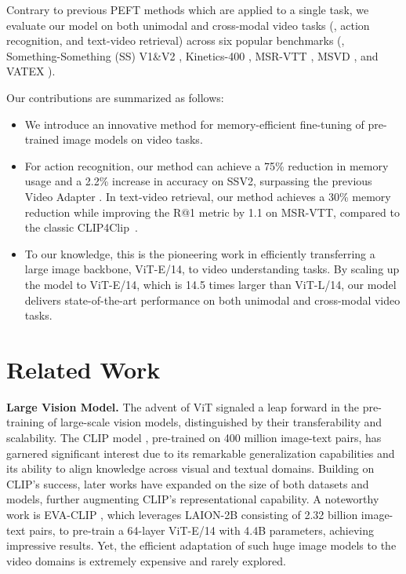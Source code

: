 \documentclass[10pt,twocolumn,letterpaper]{article}
\begin{document}
Contrary to previous PEFT methods which are applied to a single task, we evaluate our model on both unimodal and cross-modal video tasks (\ie, action recognition, and text-video retrieval) across six popular benchmarks (\ie, Something-Something (SS) V1\&V2 \cite{something}, Kinetics-400 \cite{kinetics}, MSR-VTT \cite{msrvtt}, MSVD \cite{msvd}, and VATEX \cite{vatex}).

Our contributions are summarized as follows:
\begin{itemize}
\item We introduce an innovative method for memory-efficient fine-tuning of pre-trained image models on video tasks.
\item For action recognition, our method can achieve a 75\% reduction in memory usage and a 2.2\% increase in accuracy on SSV2, surpassing the previous Video Adapter \cite{aim}. In text-video retrieval, our method achieves a 30\% memory reduction while improving the R@1 metric by 1.1 on MSR-VTT, compared to the classic CLIP4Clip~\cite{clip4clip}.
\item  To our knowledge, this is the pioneering work in efficiently transferring a large image backbone, ViT-E/14, to video understanding tasks. By scaling up the model to ViT-E/14, which is 14.5 times larger than ViT-L/14, our model delivers state-of-the-art performance on both unimodal and cross-modal video tasks.
\end{itemize}

%
 \section{Related Work}
\label{sec:formatting}

\noindent\textbf{Large Vision Model.} The advent of ViT \cite{vit} signaled a leap forward in the pre-training of large-scale vision models, distinguished by their transferability and scalability. The CLIP model \cite{clip}, pre-trained on 400 million image-text pairs, has garnered significant interest due to its remarkable generalization capabilities and its ability to align knowledge across visual and textual domains. Building on CLIP's success, later works \cite{open_clip, eva, chineseCLIP} have expanded on the size of both datasets and models, further augmenting CLIP's representational capability. A noteworthy work is EVA-CLIP \cite{eva}, which leverages LAION-2B \cite{laion5b} consisting of 2.32 billion image-text pairs, to pre-train a 64-layer ViT-E/14 with 4.4B parameters, achieving impressive results. Yet, the efficient adaptation of such huge image models to the video domains is extremely expensive and rarely explored.
\end{document}
